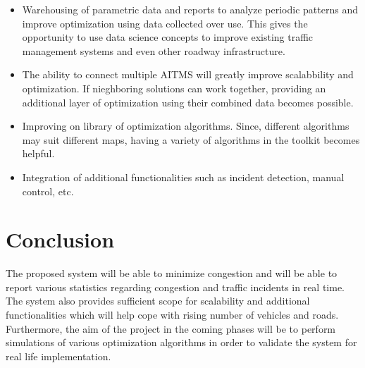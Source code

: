 \documentclass[openany,12pt]{report}
\begin{document}
	\begin{itemize}
		\item{Warehousing of parametric data and reports to analyze periodic patterns and improve optimization using data collected over use. This gives the opportunity to use data science concepts to improve existing traffic management systems and even other roadway infrastructure.}
		\item{The ability to connect multiple AITMS will greatly improve scalabbility and optimization. If nieghboring solutions can work together, providing an additional layer of optimization using their combined data becomes possible.}
		\item{Improving on library of optimization algorithms. Since, different algorithms may suit different maps, having a variety of algorithms in the toolkit becomes helpful.}
		\item{Integration of additional functionalities such as incident detection, manual control, etc.}
	\end{itemize}
	
	\chapter{Conclusion}
	\hspace*{0.5in}The proposed system will be able to minimize congestion and will be able to report various statistics regarding congestion and traffic incidents in real time. The system also provides sufficient scope for scalability and additional functionalities which will help cope with rising number of vehicles and roads. 
	Furthermore, the aim of the project in the coming phases will be to perform simulations of various optimization algorithms in order to validate the system for real life implementation.
	
\end{document}
